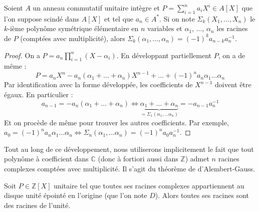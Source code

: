 





  \begin{lemma}
    \label{theoreme-de-kronecker-1}
    Soient $A$ un anneau commutatif unitaire intègre et $P = \sum_{i=1}^n a_iX^i \in A[X]$ que l'on suppose scindé dans $A[X]$ et tel que $a_n \in A^*$. Si on note $\Sigma_k(X_1, \dots, X_n)$ le $k$-ième polynôme symétrique élémentaire en $n$ variables et $\alpha_1$, ..., $\alpha_n$ les racines de $P$ (comptées avec multiplicité), alors $\Sigma_k(\alpha_1, \dots, \alpha_n) = (-1)^k a_{n-k} a_n^{-1}$.
  \end{lemma}

  \begin{proof}
    On a $P = a_n \prod_{i=1}^n (X-\alpha_i)$. En développant partiellement $P$, on a de même :
    \[ P = a_n X^n - a_n (\alpha_1 + \dots + \alpha_n)X^{n-1} + \dots + (-1)^n a_n \alpha_1 \dots \alpha_n \]
    Par identification avec la forme développée, les coefficients de $X^{n-1}$ doivent être égaux. En particulier :
    \[ a_{n-1} = -a_n (\alpha_1 + \dots + \alpha_n) \iff \underbrace{\alpha_1 + \dots + \alpha_n}_{= \Sigma_1(\alpha_1, \dots \alpha_n)} = - a_{n-1} a_n^{-1} \]
    Et on procède de même pour trouver les autres coefficients. Par exemple, $a_0 = (-1)^n a_n \alpha_1 \dots \alpha_n \iff \Sigma_n(\alpha_1, \dots \alpha_n) = (-1)^n a_0 a_n^{-1}$.
  \end{proof}

  \begin{remark}
    Tout au long de ce développement, nous utiliserons implicitement le fait que tout polynôme à coefficient dans $\mathbb{C}$ (donc à fortiori aussi dans $\mathbb{Z}$) admet $n$ racines complexes comptées avec multiplicité. Il s'agit du théorème de d'Alembert-Gauss.
  \end{remark}


  \begin{theorem}[Kronecker]
    \label{theoreme-de-kronecker-2}
    Soit $P \in \mathbb{Z}[X]$ unitaire tel que toutes ses racines complexes appartiennent au disque unité épointé en l'origine (que l'on note $D$). Alors toutes ses racines sont des racines de l'unité.
  \end{theorem}

